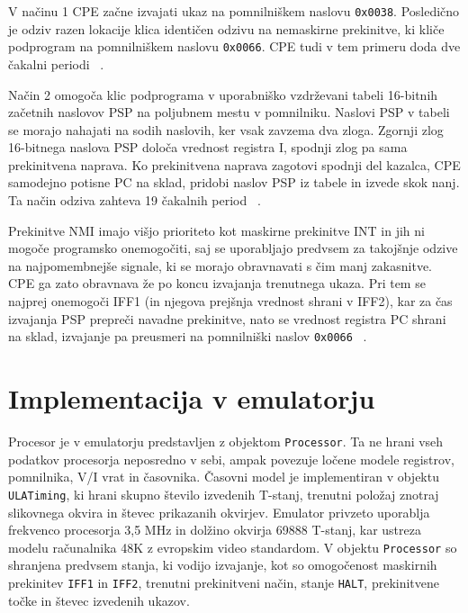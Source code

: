 \documentclass[a4paper, 12pt, openright]{book}
\begin{document}
    V načinu 1 CPE začne izvajati ukaz na pomnilniškem naslovu \texttt{0x0038}.
    Posledično je odziv razen lokacije klica identičen odzivu na nemaskirne
    prekinitve, ki kliče podprogram na pomnilniškem naslovu \texttt{0x0066}. CPE tudi
    v tem primeru doda dve čakalni periodi ~\cite{z80cpuusermanual}.

    Način 2 omogoča klic podprograma v uporabniško vzdrževani tabeli 16-bitnih
    začetnih naslovov PSP na poljubnem mestu v pomnilniku. Naslovi PSP v tabeli se
    morajo nahajati na sodih naslovih, ker vsak zavzema dva zloga. Zgornji zlog 16-bitnega
    naslova PSP določa vrednost registra I, spodnji zlog pa sama prekinitvena
    naprava. Ko prekinitvena naprava zagotovi spodnji del kazalca, CPE samodejno
    potisne PC na sklad, pridobi naslov PSP iz tabele in izvede skok nanj. Ta
    način odziva zahteva 19 čakalnih period ~\cite{z80cpuusermanual}.

    Prekinitve NMI imajo višjo prioriteto kot maskirne prekinitve INT in jih ni mogoče
    programsko onemogočiti, saj se uporabljajo predvsem za takojšnje odzive na
    najpomembnejše signale, ki se morajo obravnavati s čim manj zakasnitve. CPE
    ga zato obravnava že po koncu izvajanja trenutnega ukaza. Pri tem se najprej onemogoči
    IFF1 (in njegova prejšnja vrednost shrani v IFF2), kar za čas izvajanja PSP
    prepreči navadne prekinitve, nato se vrednost registra PC shrani na sklad,
    izvajanje pa preusmeri na pomnilniški naslov \texttt{0x0066} ~\cite{z80cpuusermanual}.

    \section{Implementacija v emulatorju}

    Procesor je v emulatorju predstavljen z objektom \texttt{Processor}. Ta ne hrani
    vseh podatkov procesorja neposredno v sebi, ampak povezuje ločene modele
    registrov, pomnilnika, V/I vrat in časovnika. Časovni model je implementiran v
    objektu \texttt{ULATiming}, ki hrani skupno število izvedenih T-stanj,
    trenutni položaj znotraj slikovnega okvira in števec prikazanih okvirjev. Emulator
    privzeto uporablja frekvenco procesorja 3,5 MHz in dolžino okvirja 69888 T-stanj,
    kar ustreza modelu računalnika 48K z evropskim video standardom. V objektu \texttt{Processor}
    so shranjena predvsem stanja, ki vodijo izvajanje, kot so omogočenost
    maskirnih prekinitev \texttt{IFF1} in \texttt{IFF2}, trenutni prekinitveni način,
    stanje \texttt{HALT}, prekinitvene točke in števec izvedenih ukazov.
\end{document}
